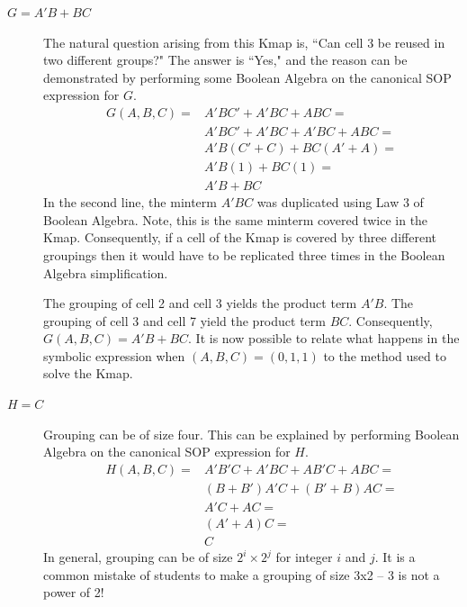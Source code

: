 \begin{process:minimizationKmap}
\begin{description}
\item [$G=A'B + BC$]
The natural question arising from this Kmap is, ``Can 
cell 3 be reused in two different groups?"  The answer is ``Yes," and the reason
can be demonstrated by performing some Boolean Algebra on the canonical 
SOP expression for $G$.
$$\begin{array}{ll}
G(A,B,C) =	& A'BC' + A'BC + ABC = \\
		& A'BC' + A'BC + A'BC + ABC = \\
		& A'B(C' + C) + BC(A'+A) = \\
		& A'B(1) + BC(1) = \\
		& A'B + BC 
\end{array}$$
In the second line, the minterm $A'BC$ was duplicated using Law 3 of Boolean 
Algebra.  Note, this is the same minterm covered twice in the 
Kmap.  Consequently, if a cell of the Kmap is covered by three different
groupings then it would have to be replicated three times in the Boolean 
Algebra simplification.  

The grouping of cell 2 and cell 3 yields the product term $A'B$.  The 
grouping of cell 3 and cell 7 yield the product term $BC$.  
Consequently, $G(A,B,C) = A'B + BC$.  It is now possible to relate what 
happens in the symbolic expression when $(A,B,C) = (0,1,1)$ to the method
used to solve the Kmap.

\item [$H=C$] 
Grouping can be of size four.  This can be explained by performing Boolean 
Algebra on the canonical SOP expression for $H$.
$$\begin{array}{ll}
H(A,B,C) = 	& A'B'C + A'BC + AB'C + ABC = \\
		& (B+B')A'C + (B'+B)AC =  \\
		& A'C + AC = \\
		& (A'+A)C = \\
		& C 
\end{array}$$
In general, grouping can be of size $2^i \times 2^j$ for integer $i$ and $j$.
It is a common mistake of students to make a grouping of size 3x2 --  3 is not
a power of 2!


\end{description}
\end{process:minimizationKmap}
